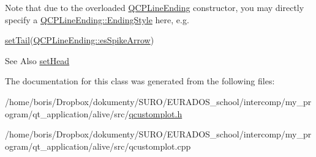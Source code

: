 Note that due to the overloaded \hyperlink{classQCPLineEnding}{Q\-C\-P\-Line\-Ending} constructor, you may directly specify a \hyperlink{classQCPLineEnding_a5ef16e6876b4b74959c7261d8d4c2cd5}{Q\-C\-P\-Line\-Ending\-::\-Ending\-Style} here, e.\-g.
\begin{DoxyCode}
\hyperlink{classQCPItemCurve_ac3488d8b1a6489c845dc5bff3ef71124}{setTail}(\hyperlink{classQCPLineEnding_a5ef16e6876b4b74959c7261d8d4c2cd5ab9964d0d03f812d1e79de15edbeb2cbf}{QCPLineEnding::esSpikeArrow}) 
\end{DoxyCode}


\begin{DoxySeeAlso}{See Also}
\hyperlink{classQCPItemCurve_a08a30d9cdd63995deea3d9e20430676f}{set\-Head} 
\end{DoxySeeAlso}


The documentation for this class was generated from the following files\-:\begin{DoxyCompactItemize}
\item 
/home/boris/\-Dropbox/dokumenty/\-S\-U\-R\-O/\-E\-U\-R\-A\-D\-O\-S\-\_\-school/intercomp/my\-\_\-program/qt\-\_\-application/alive/src/\hyperlink{qcustomplot_8h}{qcustomplot.\-h}\item 
/home/boris/\-Dropbox/dokumenty/\-S\-U\-R\-O/\-E\-U\-R\-A\-D\-O\-S\-\_\-school/intercomp/my\-\_\-program/qt\-\_\-application/alive/src/qcustomplot.\-cpp\end{DoxyCompactItemize}
